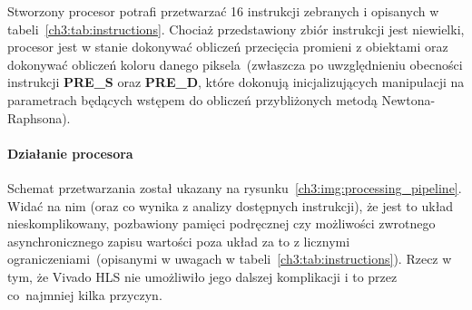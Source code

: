Stworzony procesor potrafi przetwarzać 16 instrukcji zebranych i opisanych w tabeli~\ref{ch3:tab:instructions}. Chociaż przedstawiony zbiór instrukcji jest niewielki, procesor jest w stanie dokonywać obliczeń przecięcia promieni z obiektami oraz dokonywać obliczeń koloru danego piksela~(zwłaszcza po uwzględnieniu obecności instrukcji \textbf{PRE\_S} oraz \textbf{PRE\_D}, które dokonują inicjalizujących manipulacji na parametrach będących wstępem do obliczeń przybliżonych metodą Newtona-Raphsona). 

\paragraph{Działanie procesora} Schemat przetwarzania został ukazany na rysunku~\ref{ch3:img:processing_pipeline}. 
Widać na nim (oraz co wynika z analizy dostępnych instrukcji), że jest to układ nieskomplikowany, pozbawiony pamięci podręcznej czy możliwości zwrotnego asynchronicznego zapisu wartości poza układ za to z licznymi ograniczeniami~(opisanymi w uwagach w tabeli~\ref{ch3:tab:instructions}). Rzecz w tym, że Vivado HLS nie umożliwiło jego dalszej komplikacji i to przez co~najmniej kilka przyczyn. 
